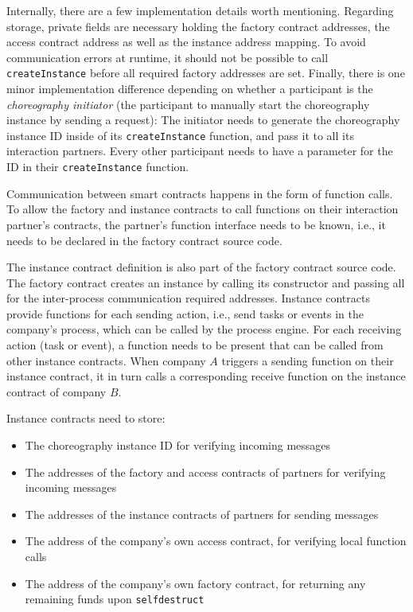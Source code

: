 \documentclass[runningheads]{llncs}
\begin{document}
Internally, there are a few implementation details worth mentioning.
Regarding storage, private fields are necessary holding the factory contract addresses, the access contract address as well as the instance address mapping.
To avoid communication errors at runtime, it should not be possible to call \texttt{createInstance} before all required factory addresses are set.
Finally, there is one minor implementation difference depending on whether a participant is the \emph{choreography initiator} (the participant to manually start the choreography instance by sending a request):
The initiator needs to generate the choreography instance ID inside of its \texttt{createInstance} function, and pass it to all its interaction partners.
Every other participant needs to have a parameter for the ID in their \texttt{createInstance} function.

Communication between smart contracts happens in the form of function calls.
To allow the factory and instance contracts to call functions on their interaction partner's contracts, the partner's function interface needs to be known, i.e., it needs to be declared in the factory contract source code.

The instance contract definition is also part of the factory contract source code.
The factory contract creates an instance by calling its constructor and passing all for the inter-process communication required addresses.
Instance contracts provide functions for each sending action, i.e., send tasks or events in the company's process, which can be called by the process engine.
For each receiving action (task or event), a function needs to be present that can be called from other instance contracts.
When company $A$ triggers a sending function on their instance contract, it in turn calls a corresponding receive function on the instance contract of company $B$.

Instance contracts need to store:
\begin{itemize}
	\item The choreography instance ID for verifying incoming messages
	\item The addresses of the factory and access contracts of partners for verifying incoming messages
	\item The addresses of the instance contracts of partners for sending messages
	\item The address of the company's own access contract, for verifying local function calls
	\item The address of the company's own factory contract, for returning any remaining funds upon \texttt{selfdestruct}
\end{itemize}
\end{document}
